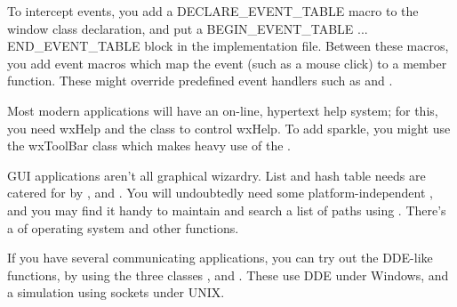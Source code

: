 To intercept events, you add a DECLARE\_EVENT\_TABLE macro to the window class declaration,
and put a BEGIN\_EVENT\_TABLE ... END\_EVENT\_TABLE block in the implementation file. Between these
macros, you add event macros which map the event (such as a mouse click) to a member function.
These might override predefined event handlers such as  and
\rtfsp{}.

Most modern applications will have an on-line, hypertext help system; for this, you
need wxHelp and the  class to control
wxHelp. To add sparkle, you might use the wxToolBar class
which makes heavy use of the .

GUI applications aren't all graphical wizardry. List and hash table needs are
catered for by ,  and .
You will undoubtedly need some platform-independent ,
and you may find it handy to maintain and search a list of paths using .
There's a  of operating system and other functions.

If you have several communicating applications, you can try out the DDE-like functions, by
using the three classes ,  and
\rtfsp{}. These use DDE under Windows, and a simulation using
sockets under UNIX.


